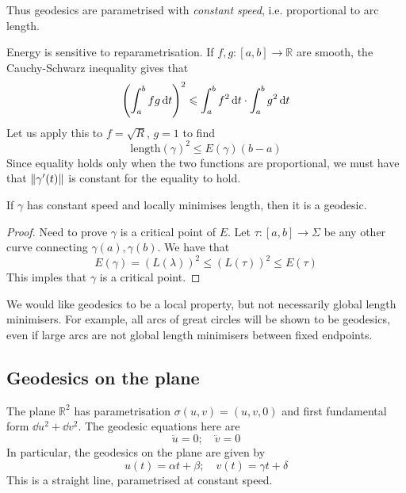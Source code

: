 \documentclass[a4paper]{article}
\begin{document}
Thus geodesics are parametrised with \textit{constant speed}, i.e. proportional to arc length. 

Energy is sensitive to reparametrisation.
If \( f, g \colon [a,b] \to \mathbb R \) are smooth, the Cauchy-Schwarz inequality gives that
\[
	\qty(\int_a^b fg \dd{t})^2 \leqslant \int_a^b f^2 \dd{t} \cdot \int_a^b g^2 \dd{t}
\]
Let us apply this to \( f = \sqrt{R} \), \( g = 1 \) to find
\[
	\mathrm{length}(\gamma)^2 \leq E(\gamma)(b-a)
\]
Since equality holds only when the two functions are proportional, we must have that \( \norm{\gamma'(t)} \) is constant for the equality to hold.

\begin{corollary}
	If \( \gamma \) has constant speed and locally minimises length, then it is a geodesic.
\end{corollary}
\begin{proof}
	Need to prove $ \gamma $ is a critical point of $E$. Let $ \tau: [a,b]\to \Sigma $ be any other curve connecting $\gamma(a), \gamma(b)$. We have that 
	\[
		E(\gamma) = (L(\lambda))^2\le (L(\tau))^2 \le E(\tau)
	\]
	This imples that $ \gamma $ is a critical point. 
\end{proof}

\begin{remark}
	We would like geodesics to be a local property, but not necessarily global length minimisers.
	For example, all arcs of great circles will be shown to be geodesics, even if large arcs are not global length minimisers between fixed endpoints.
\end{remark}

\subsection{Geodesics on the plane}
The plane \( \mathbb R^2 \) has parametrisation \( \sigma(u,v) = (u,v,0) \) and first fundamental form \( \dd{u}^2 + \dd{v}^2 \).
The geodesic equations here are
\[
	\ddot u = 0;\quad \ddot v = 0
\]
In particular, the geodesics on the plane are given by
\[
	u(t) = \alpha t + \beta;\quad v(t) = \gamma t + \delta
\]
This is a straight line, parametrised at constant speed.
\end{document}
